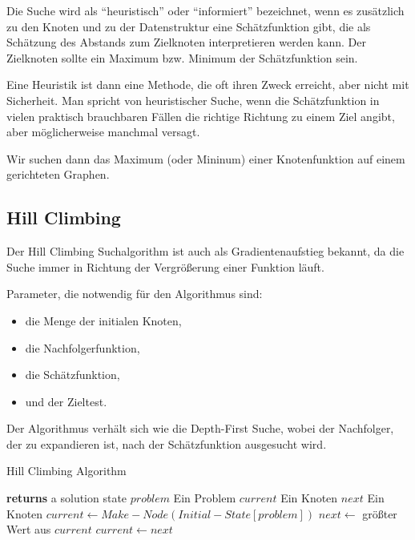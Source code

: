 Die Suche wird als \enquote{heuristisch} oder \enquote{informiert} bezeichnet, wenn es zusätzlich zu den Knoten und zu der Datenstruktur eine Schätzfunktion gibt, die als Schätzung des Abstands zum Zielknoten interpretieren werden kann. Der Zielknoten sollte ein Maximum bzw. Minimum der Schätzfunktion sein.

Eine Heuristik ist dann eine Methode, die oft ihren Zweck erreicht, aber nicht mit Sicherheit. Man spricht von heuristischer Suche, wenn die Schätzfunktion in vielen praktisch brauchbaren Fällen die richtige Richtung zu einem Ziel angibt, aber möglicherweise manchmal versagt.

Wir suchen dann das Maximum (oder Mininum) einer Knotenfunktion auf einem gerichteten Graphen.

\subsection{Hill Climbing}
Der Hill Climbing Suchalgorithm ist auch als Gradientenaufstieg bekannt, da die Suche immer in Richtung der Vergrößerung einer Funktion läuft.

Parameter, die notwendig für den Algorithmus sind:

\begin{itemize}
  \item die Menge der initialen Knoten,
  \item die Nachfolgerfunktion,
  \item die Schätzfunktion,
  \item und der Zieltest.
\end{itemize}

Der Algorithmus verhält sich wie die Depth-First Suche, wobei der Nachfolger, der zu expandieren ist, nach der Schätzfunktion ausgesucht wird.

\begin{algorithm}
\caption{Hill Climbing Algorithm}
\begin{algorithmic}[1]
 \State \textbf{returns} a solution state
\INPUT
\Statex $problem$ \Comment Ein Problem
\Statex $current$  \Comment Ein Knoten
\Statex $next$  \Comment Ein Knoten
\State $current \gets Make-Node(Initial-State[problem])$
\Loop
\State $next \gets$ größter Wert aus $current$
\State $current \gets next$
\EndLoop
\EndFunction
\end{algorithmic}
\end{algorithm}


